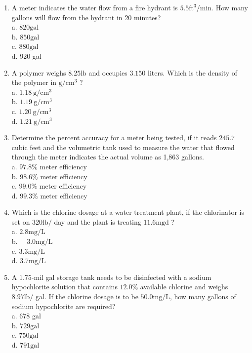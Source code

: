 \documentclass[10pt]{article}
\begin{document}
\begin{enumerate}
  \item A meter indicates the water flow from a fire hydrant is $5.5 \mathrm{ft}^{3} / \mathrm{min}$. How many gallons will flow from the hydrant in 20 minutes?\\
a. $820 \mathrm{gal}$\\
b. $850 \mathrm{gal}$\\
c. $880 \mathrm{gal}$\\
d. 920 gal

  \item A polymer weighs $8.25 \mathrm{lb}$ and occupies $3.150$ liters. Which is the density of the polymer in $\mathrm{g} / \mathrm{cm}^{3}$ ?\\
a. $1.18 \mathrm{~g} / \mathrm{cm}^{3}$\\
b. $1.19 \mathrm{~g} / \mathrm{cm}^{3}$\\
c. $1.20 \mathrm{~g} / \mathrm{cm}^{3}$\\
d. $1.21 \mathrm{~g} / \mathrm{cm}^{3}$

  \item Determine the percent accuracy for a meter being tested, if it reads $245.7$ cubic feet and the volumetric tank used to measure the water that flowed through the meter indicates the actual volume as 1,863 gallons.\\
a. $97.8 \%$ meter efficiency\\
b. $98.6 \%$ meter efficiency\\
c. $99.0 \%$ meter efficiency\\
d. $99.3 \%$ meter efficiency

  \item Which is the chlorine dosage at a water treatment plant, if the chlorinator is set on $320 \mathrm{lb} /$ day and the plant is treating $11.6 \mathrm{mgd}$ ?\\
a. $2.8 \mathrm{mg} / \mathrm{L}$\\
b. $\quad 3.0 \mathrm{mg} / \mathrm{L}$\\
c. $3.3 \mathrm{mg} / \mathrm{L}$\\
d. $3.7 \mathrm{mg} / \mathrm{L}$

  \item A 1.75-mil gal storage tank needs to be disinfected with a sodium hypochlorite solution that contains $12.0 \%$ available chlorine and weighs $8.97 \mathrm{lb} /$ gal. If the chlorine dosage is to be $50.0 \mathrm{mg} / \mathrm{L}$, how many gallons of sodium hypochlorite are required?\\
a. 678 gal\\
b. $729 \mathrm{gal}$\\
c. $750 \mathrm{gal}$\\
d. $791 \mathrm{gal}$


\end{enumerate}
\end{document}

